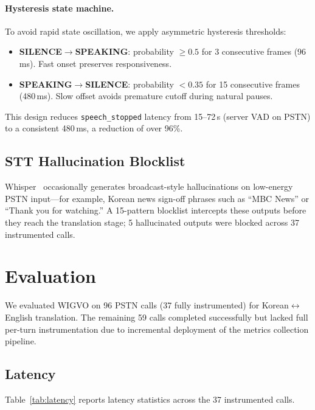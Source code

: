 \documentclass[11pt]{article}
\begin{document}
\paragraph{Hysteresis state machine.}
To avoid rapid state oscillation, we apply asymmetric hysteresis thresholds:

\begin{itemize}
    \item \textbf{SILENCE$\to$SPEAKING}: probability $\geq 0.5$ for 3 consecutive frames (96\,ms). Fast onset preserves responsiveness.
    \item \textbf{SPEAKING$\to$SILENCE}: probability $< 0.35$ for 15 consecutive frames (480\,ms). Slow offset avoids premature cutoff during natural pauses.
\end{itemize}

This design reduces \texttt{speech\_stopped} latency from 15--72\,s (server VAD on PSTN) to a consistent 480\,ms, a reduction of over 96\%.

\subsection{STT Hallucination Blocklist}

Whisper~\citep{whisper_radford_2023} occasionally generates broadcast-style hallucinations on low-energy PSTN input---for example, Korean news sign-off phrases such as ``MBC News'' or ``Thank you for watching.'' A 15-pattern blocklist intercepts these outputs before they reach the translation stage; 5 hallucinated outputs were blocked across 37 instrumented calls.

\section{Evaluation}
\label{sec:evaluation}

We evaluated WIGVO on 96 PSTN calls (37 fully instrumented) for Korean$\leftrightarrow$English translation. The remaining 59 calls completed successfully but lacked full per-turn instrumentation due to incremental deployment of the metrics collection pipeline.

\subsection{Latency}

Table~\ref{tab:latency} reports latency statistics across the 37 instrumented calls.
\end{document}

